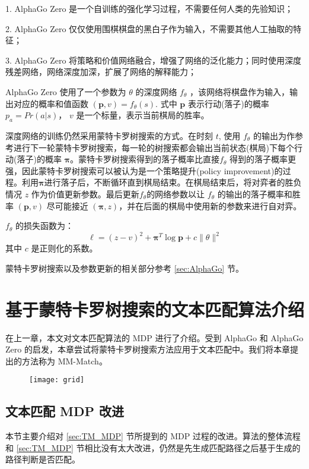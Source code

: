 1. AlphaGo Zero 是一个自训练的强化学习过程，不需要任何人类的先验知识；

2. AlphaGo Zero 仅仅使用围棋棋盘的黑白子作为输入，不需要其他人工抽取的特征；

3. AlphaGo Zero 将策略和价值网络融合，增强了网络的泛化能力；同时使用深度残差网络，网络深度加深，扩展了网络的解释能力；

AlphaGo Zero 使用了一个参数为 $\theta$ 的深度网络 $f_\theta$ ，该网络将棋盘作为输入，输出对应的概率和值函数 $(\mathbf{p}, v) = f_\theta(s)$. 式中 $\mathbf{p}$ 表示行动(落子)的概率$p_a = Pr(a|s)$， $v$ 是一个标量，表示当前棋局的胜率。

深度网络的训练仍然采用蒙特卡罗树搜索的方式。在时刻 $t$, 使用 $f_\theta$ 的输出为作参考进行下一轮蒙特卡罗树搜索，每一轮的树搜索都会输出当前状态(棋局)下每个行动(落子)的概率 $\mathbf{\pi}$。蒙特卡罗树搜索得到的落子概率比直接$f_\theta$  得到的落子概率更强，因此蒙特卡罗树搜索可以被认为是一个策略提升(policy improvement)的过程。利用$\mathbf{\pi}$进行落子后，不断循环直到棋局结束。在棋局结束后，将对弈者的胜负情况 $z$ 作为价值更新参数。最后更新$f_\theta$的网络参数以让 $f_\theta$ 的输出的落子概率和胜率 $(\mathbf{p}, v)$ 尽可能接近 $(\mathbf{\pi}, z)$，并在后面的棋局中使用新的参数来进行自对弈。

$f_\theta$ 的损失函数为：
$$
\ell = (z-v)^2 + \mathbf{\pi}^T\log \mathbf{p} + c\|\theta\|^2
$$
其中 $c$ 是正则化的系数。

蒙特卡罗树搜索以及参数更新的相关部分参考 \ref{sec:AlphaGo} 节。

\section{基于蒙特卡罗树搜索的文本匹配算法介绍}
在上一章，本文对文本匹配算法的 MDP 进行了介绍。受到 AlphaGo 和 AlphaGo Zero 的启发，本章尝试将蒙特卡罗树搜索方法应用于文本匹配中。我们将本章提出的方法称为 MM-Match。

\begin{figure}[!htbp]
    \centering
    \texttt{[image: grid]}
    \label{fig:MCTS_sum}
\end{figure}

\subsection{文本匹配 MDP 改进}
本节主要介绍对 \ref{sec:TM_MDP} 节所提到的 MDP 过程的改进。算法的整体流程和 \ref{sec:TM_MDP} 节相比没有太大改进，仍然是先生成匹配路径之后基于生成的路径判断是否匹配。

